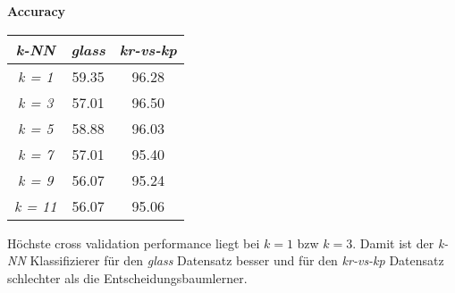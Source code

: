 
\textbf{Accuracy}

\begin{table}[htb]
	\centering
\begin{tabular}{c|c|c}
                \emph{k-NN}       & \emph{glass} & \emph{kr-vs-kp}  \\ \hline
				\emph{k = 1}  & 59.35  & 96.28  \\ \hline
				\emph{k = 3}  & 57.01  & 96.50  \\ \hline
				\emph{k = 5}  & 58.88  & 96.03  \\ \hline
				\emph{k = 7}  & 57.01  & 95.40  \\ \hline
				\emph{k = 9}  & 56.07  & 95.24  \\ \hline
				\emph{k = 11} & 56.07  & 95.06  
\end{tabular}
\end{table}

H\"ochste cross validation performance liegt bei $k = 1$ bzw $k = 3$. Damit ist der \emph{k-NN} Klassifizierer f\"ur den \emph{glass} Datensatz besser und f\"ur den \emph{kr-vs-kp} Datensatz schlechter als die Entscheidungsbaumlerner.



